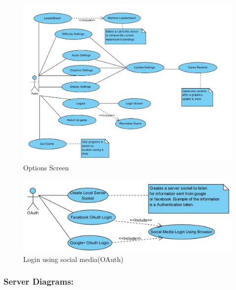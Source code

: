\documentclass[letterpaper]{article}
\begin{document}
					\begin{figure}[H]
					\centering
					\includegraphics[width=140mm]{UML_Diagram/Use_Case/OptionsScreen_UseCase.jpg}
					\caption{Options Screen}
					\end{figure}
				
				\begin{figure}[H]
					\centering
					\includegraphics[width=140mm]{UML_Diagram/Use_Case/OAuth.jpg}
					\caption{Login using social media(OAuth)}
					\end{figure}
				
				\vspace{0.2in}
				\subsubsection*{Server Diagrams:}
				\vspace{0.2in}
				
\end{document}
